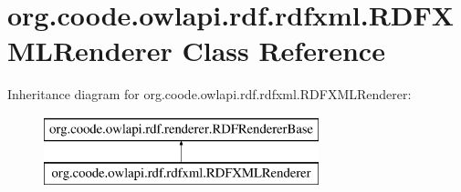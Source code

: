 \hypertarget{classorg_1_1coode_1_1owlapi_1_1rdf_1_1rdfxml_1_1_r_d_f_x_m_l_renderer}{\section{org.\-coode.\-owlapi.\-rdf.\-rdfxml.\-R\-D\-F\-X\-M\-L\-Renderer Class Reference}
\label{classorg_1_1coode_1_1owlapi_1_1rdf_1_1rdfxml_1_1_r_d_f_x_m_l_renderer}
}
Inheritance diagram for org.\-coode.\-owlapi.\-rdf.\-rdfxml.\-R\-D\-F\-X\-M\-L\-Renderer\-:\begin{figure}[H]
\begin{center}
\leavevmode
\includegraphics[height=2.000000cm]{classorg_1_1coode_1_1owlapi_1_1rdf_1_1rdfxml_1_1_r_d_f_x_m_l_renderer}
\end{center}
\end{figure}
